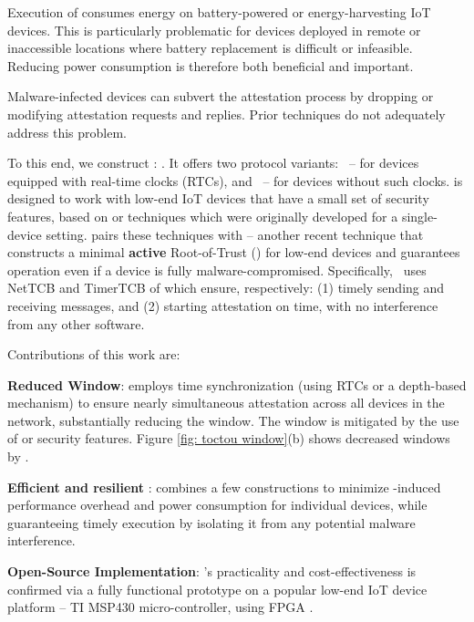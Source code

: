 Execution of \ra consumes
energy on battery-powered or energy-harvesting IoT devices. This is particularly 
problematic for devices deployed in remote or inaccessible locations where 
battery replacement is difficult or infeasible. Reducing power consumption 
is therefore both beneficial and important. 

Malware-infected devices can 
subvert the attestation process by dropping or modifying attestation 
requests and replies. Prior techniques do not adequately address this 
problem.

\noindent To this end, we construct \system: \systemtext. It 
offers two protocol variants: \trapsrtc\ -- for devices equipped with  
real-time clocks (RTCs), and \trapsnortc\ -- for devices without such clocks. 
\system is designed to work with low-end IoT devices that have a small set 
of security features, based on \rata \cite{rata} or \casu \cite{casu} \ra techniques
which were originally developed for a single-device \ra setting. \system pairs
these \ra techniques with \garota\cite{garota} -- another recent technique that constructs
a minimal {\bf active} Root-of-Trust (\rot) for low-end devices and guarantees
operation even if a device is fully malware-compromised. Specifically, \system\
uses NetTCB and TimerTCB of \garota which ensure, respectively: (1) timely
sending and receiving messages, and (2) starting attestation on time, 
with no interference from any other software.

\noindent Contributions of this work are:
%
\begin{compactenum}[(1)]
%
\item \textbf{Reduced \toctou Window}: \system employs time synchronization 
(using RTCs or a depth-based mechanism) to ensure nearly simultaneous 
attestation across all devices in the network, substantially reducing the \toctousa window. 
The \toctoura window is mitigated by the use of \casu or \rata security features.
Figure \ref{fig: toctou window}(b) shows decreased \toctou windows by \system.
%
\item \textbf{Efficient and resilient \ra}: \system combines a few \rot constructions 
to minimize \ra-induced performance overhead and power consumption for individual 
devices, while guaranteeing timely \ra execution by isolating it from any potential 
malware interference.
%
\item \textbf{Open-Source Implementation}: \system's practicality and 
cost-effectiveness is confirmed via a fully functional prototype 
on a popular low-end IoT device platform -- TI MSP430 micro-controller,
using FPGA \cite{TRAPSAnonOpenSource}.
%
\end{compactenum}

